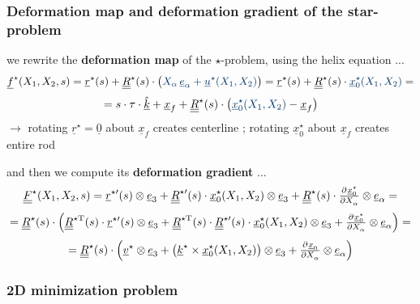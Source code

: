 \begin{frame}
  \frametitle{Deformation map and deformation gradient of the star-problem}

  we rewrite the \textbf{deformation map} of the $\star$-problem, using the helix equation ... 
  \begin{displaymath}
    \underline{f}^{\star}(X_1,X_2,s) =
    \underline{r}^{\star}(s) + 
    \doubleunderline{R}^{\star}(s) \cdot \bigl( {\color{faublue} X_{\alpha} \, \underline{e}_{\alpha} + \underline{u}^{\star}(X_1,X_2)} \bigr) = 
    \underline{r}^{\star}(s) + 
    \doubleunderline{R}^{\star}(s) \cdot {\color{faublue} \underline{x}^{\star}_0(X_1,X_2)} =
  \end{displaymath}
  \begin{displaymath}
    = s \cdot \tau \cdot \underline{\hat{k}} + \underline{x}_f + \doubleunderline{R}^{\star}(s) \cdot \bigl( {\color{faublue} \underline{x}^{\star}_0(X_1,X_2)} - \underline{x}_f \bigr)
  \end{displaymath}
  $\rightarrow$ rotating $\underline{r}^{\star} = \underline{0}$ about $\underline{x}_f$ creates centerline ; rotating $\underline{x}^{\star}_0$ about $\underline{x}_f$ creates entire rod
  
  \vspace{1.5em}
  and then we compute its \textbf{deformation gradient} ...
  \begin{displaymath}
    \doubleunderline{F}^{\star}(X_1,X_2,s) =
    \underline{r}^{\star \prime}(s) \otimes \underline{e}_3 +
    \doubleunderline{R}^{\star \prime}(s) \cdot \underline{x}_0^{\star}(X_1,X_2) \otimes \underline{e}_3 +
    \doubleunderline{R}^{\star}(s) \cdot \pd{\underline{x}_0^{\star}}{X_{\alpha}} \otimes \underline{e}_{\alpha} =
  \end{displaymath}
  \begin{displaymath}
  = \doubleunderline{R}^{\star}(s) \cdot \Bigl(
      \doubleunderline{R}^{\star \mathrm{T}}(s) \cdot \underline{r}^{\star \prime}(s) \otimes \underline{e}_3 +
      \doubleunderline{R}^{\star \mathrm{T}}(s) \cdot \doubleunderline{R}^{\star \prime}(s) \cdot \underline{x}_0^{\star}(X_1,X_2) \otimes \underline{e}_3 +
      \pd{\underline{x}_0^{\star}}{X_{\alpha}} \otimes \underline{e}_{\alpha}
    \Bigr) =
  \end{displaymath}
  \begin{displaymath}
    = \doubleunderline{R}^{\star}(s) \cdot \Bigl(
      \underline{v}^{\star} \otimes \underline{e}_3 +
      \bigl( \underline{k}^{\star} \times \underline{x}_0^{\star}(X_1,X_2) \bigr) \otimes \underline{e}_3 +
      \pd{\underline{x}_0}{X_{\alpha}} \otimes \underline{e}_{\alpha}
    \Bigr)
  \end{displaymath}

\end{frame}


\begin{frame}
  \frametitle{2D minimization problem}

  
\end{frame}
